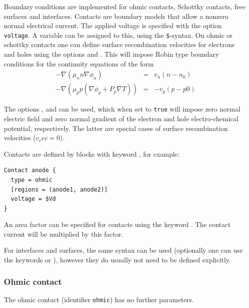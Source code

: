 Boundary conditions are implemented for ohmic contacts, Schottky contacts, free surfaces and interfaces.
Contacts are boundary models that allow a nonzero normal electrical current.
The applied voltage is specified with the option \texttt{voltage}.
A variable can be assigned to this, using the \verb+$+-syntax.
On ohmic or schottky contacts one can define surface recombination velocities for electrons and holes using the options  and . This will impose Robin type boundary conditions for the continuity equations of the form
\begin{eqnarray}
-\nabla(\mu_n n \nabla\phi_n ) & = & v_n(n - n_0) \\
-\nabla(\mu_p p (\nabla\phi_p + P_p \nabla T) ) & = & -v_p(p - p0)
\end{eqnarray}

The options ,  and  can be used, which when set to \verb+true+ will impose zero normal electric field and zero normal gradient of the electron and hole electro-chemical potential, respectively.
The latter are special cases of surface recombination velocities ($v_rec = 0$).

Contacts are defined by blocks with keyword , for example:
\begin{verbatim}
Contact anode {
  type = ohmic
  [regions = (anode1, anode2)]
  voltage = $Vd
}
\end{verbatim}

An area factor can be specified for contacts using the keyword . The contact current will be multiplied by this factor.

For interfaces and surfaces, the same syntax can be used (optionally one can use the keywords  or ), however they do usually not need to be defined explicitly.

\subsubsection{Ohmic contact}
The ohmic contact (identifier \texttt{ohmic}) has no further parameters.


